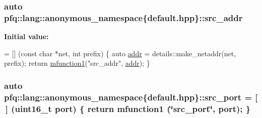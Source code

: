 \hypertarget{namespacepfq_1_1lang_1_1anonymous__namespace_02default_8hpp_03_a2ee09b5a65a64d60bc797b2ecd1c8a4a}{
\subsubsection[{src\+\_\+addr}]{\setlength{\rightskip}{0pt plus 5cm}auto pfq\+::lang\+::anonymous\+\_\+namespace\{default.\+hpp\}\+::src\+\_\+addr}}\label{namespacepfq_1_1lang_1_1anonymous__namespace_02default_8hpp_03_a2ee09b5a65a64d60bc797b2ecd1c8a4a}
{\bfseries Initial value\+:}
\begin{DoxyCode}
= [] (\textcolor{keyword}{const} \textcolor{keywordtype}{char} *net, \textcolor{keywordtype}{int} prefix)
        \{
            \textcolor{keyword}{auto} \hyperlink{namespacepfq_1_1lang_1_1anonymous__namespace_02default_8hpp_03_a13cabe468839119d8d68540e3c60718b}{addr} = details::make\_netaddr(net, prefix);
            \textcolor{keywordflow}{return} \hyperlink{namespacepfq_1_1lang_a68d775c68562fbd0ab9ef213f2519499}{mfunction1}(\textcolor{stringliteral}{"src\_addr"}, \hyperlink{namespacepfq_1_1lang_1_1anonymous__namespace_02default_8hpp_03_a13cabe468839119d8d68540e3c60718b}{addr});
        \}
\end{DoxyCode}
\hypertarget{namespacepfq_1_1lang_1_1anonymous__namespace_02default_8hpp_03_ad1645151270994a4f396565b70233b73}{
\subsubsection[{src\+\_\+port}]{\setlength{\rightskip}{0pt plus 5cm}auto pfq\+::lang\+::anonymous\+\_\+namespace\{default.\+hpp\}\+::src\+\_\+port = \mbox{[}$\,$\mbox{]} (uint16\+\_\+t {\bf port}) \{ return {\bf mfunction1} (\char`\"{}src\+\_\+port\char`\"{}, port); \}}}\label{namespacepfq_1_1lang_1_1anonymous__namespace_02default_8hpp_03_ad1645151270994a4f396565b70233b73}
